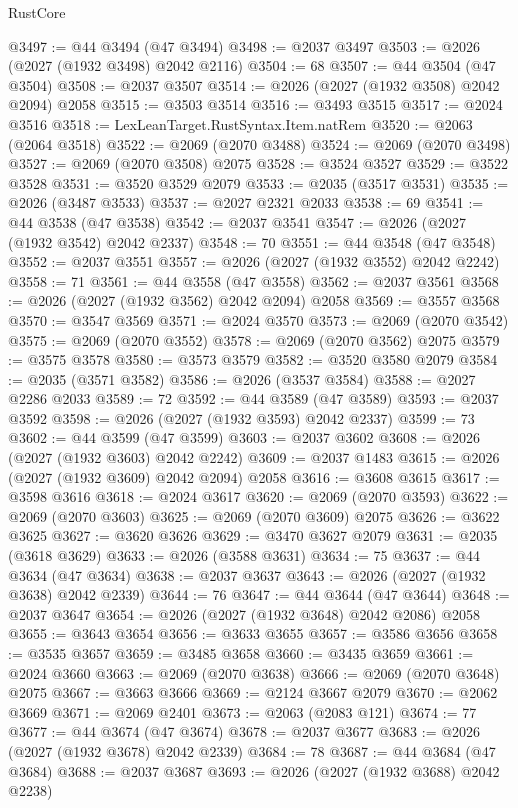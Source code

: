 \begin{lexlean}{RustCore}
\begin{coremodule}
@3497 := @44 @3494 (@47 @3494)
@3498 := @2037 @3497
@3503 := @2026 (@2027 (@1932 @3498) @2042 @2116)
@3504 := 68
@3507 := @44 @3504 (@47 @3504)
@3508 := @2037 @3507
@3514 := @2026 (@2027 (@1932 @3508) @2042 @2094) @2058
@3515 := @3503 @3514
@3516 := @3493 @3515
@3517 := @2024 @3516
@3518 := LexLeanTarget.RustSyntax.Item.natRem
@3520 := @2063 (@2064 @3518)
@3522 := @2069 (@2070 @3488)
@3524 := @2069 (@2070 @3498)
@3527 := @2069 (@2070 @3508) @2075
@3528 := @3524 @3527
@3529 := @3522 @3528
@3531 := @3520 @3529 @2079
@3533 := @2035 (@3517 @3531)
@3535 := @2026 (@3487 @3533)
@3537 := @2027 @2321 @2033
@3538 := 69
@3541 := @44 @3538 (@47 @3538)
@3542 := @2037 @3541
@3547 := @2026 (@2027 (@1932 @3542) @2042 @2337)
@3548 := 70
@3551 := @44 @3548 (@47 @3548)
@3552 := @2037 @3551
@3557 := @2026 (@2027 (@1932 @3552) @2042 @2242)
@3558 := 71
@3561 := @44 @3558 (@47 @3558)
@3562 := @2037 @3561
@3568 := @2026 (@2027 (@1932 @3562) @2042 @2094) @2058
@3569 := @3557 @3568
@3570 := @3547 @3569
@3571 := @2024 @3570
@3573 := @2069 (@2070 @3542)
@3575 := @2069 (@2070 @3552)
@3578 := @2069 (@2070 @3562) @2075
@3579 := @3575 @3578
@3580 := @3573 @3579
@3582 := @3520 @3580 @2079
@3584 := @2035 (@3571 @3582)
@3586 := @2026 (@3537 @3584)
@3588 := @2027 @2286 @2033
@3589 := 72
@3592 := @44 @3589 (@47 @3589)
@3593 := @2037 @3592
@3598 := @2026 (@2027 (@1932 @3593) @2042 @2337)
@3599 := 73
@3602 := @44 @3599 (@47 @3599)
@3603 := @2037 @3602
@3608 := @2026 (@2027 (@1932 @3603) @2042 @2242)
@3609 := @2037 @1483
@3615 := @2026 (@2027 (@1932 @3609) @2042 @2094) @2058
@3616 := @3608 @3615
@3617 := @3598 @3616
@3618 := @2024 @3617
@3620 := @2069 (@2070 @3593)
@3622 := @2069 (@2070 @3603)
@3625 := @2069 (@2070 @3609) @2075
@3626 := @3622 @3625
@3627 := @3620 @3626
@3629 := @3470 @3627 @2079
@3631 := @2035 (@3618 @3629)
@3633 := @2026 (@3588 @3631)
@3634 := 75
@3637 := @44 @3634 (@47 @3634)
@3638 := @2037 @3637
@3643 := @2026 (@2027 (@1932 @3638) @2042 @2339)
@3644 := 76
@3647 := @44 @3644 (@47 @3644)
@3648 := @2037 @3647
@3654 := @2026 (@2027 (@1932 @3648) @2042 @2086) @2058
@3655 := @3643 @3654
@3656 := @3633 @3655
@3657 := @3586 @3656
@3658 := @3535 @3657
@3659 := @3485 @3658
@3660 := @3435 @3659
@3661 := @2024 @3660
@3663 := @2069 (@2070 @3638)
@3666 := @2069 (@2070 @3648) @2075
@3667 := @3663 @3666
@3669 := @2124 @3667 @2079
@3670 := @2062 @3669
@3671 := @2069 @2401
@3673 := @2063 (@2083 @121)
@3674 := 77
@3677 := @44 @3674 (@47 @3674)
@3678 := @2037 @3677
@3683 := @2026 (@2027 (@1932 @3678) @2042 @2339)
@3684 := 78
@3687 := @44 @3684 (@47 @3684)
@3688 := @2037 @3687
@3693 := @2026 (@2027 (@1932 @3688) @2042 @2238)

\end{coremodule}
\end{lexlean}
